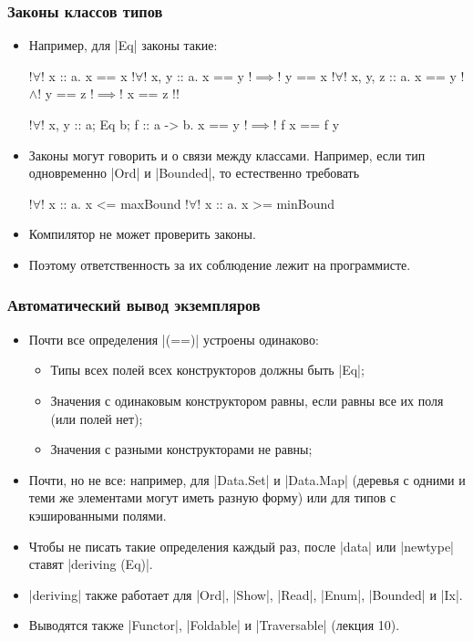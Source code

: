 \documentclass[10pt]{beamer}
\begin{document}
\begin{frame}[fragile]
  \frametitle{Законы классов типов}
  \begin{itemize}
    \item Например, для \haskinline|Eq| законы такие:\pause
          \begin{haskell}
            !$\forall$! x :: a. x == x
            !$\forall$! x, y :: a. x == y !$\implies$! y == x
            !$\forall$! x, y, z :: a. x == y !$\wedge$! y == z !$\implies$! x == z !\pause!

            !$\forall$! x, y :: a; Eq b; f :: a -> b. x == y !$\implies$\pause! 
                f x == f y
          \end{haskell}
          \pause
    \item Законы могут говорить и о связи между классами. Например, если тип одновременно \haskinline|Ord| и \haskinline|Bounded|, то естественно требовать
          \begin{haskell}
            !$\forall$! x :: a. x <= maxBound
            !$\forall$! x :: a. x >= minBound
          \end{haskell}
          \pause
    \item Компилятор не может проверить законы.
    \item Поэтому ответственность за их соблюдение лежит на программисте.
  \end{itemize}
\end{frame}

\begin{frame}[fragile]
  \frametitle{Автоматический вывод экземпляров}
  \begin{itemize}
    \item Почти все определения \haskinline|(==)| устроены одинаково:\pause
          \begin{itemize}
            \item Типы всех полей всех конструкторов должны быть \haskinline|Eq|;
            \item Значения с одинаковым конструктором равны, если равны все их поля (или полей нет);
            \item Значения с разными конструкторами не равны;
          \end{itemize}
    \item Почти, но не все: \pause например, для \haskinline|Data.Set| и \haskinline|Data.Map| (деревья с одними и теми же элементами могут иметь разную форму) или для типов с кэшированными полями.\pause
    \item Чтобы не писать такие определения каждый раз, после \haskinline|data| или \haskinline|newtype| ставят \haskinline|deriving (Eq)|.
    \item \haskinline|deriving| также работает для \haskinline|Ord|, \haskinline|Show|, \haskinline|Read|, \haskinline|Enum|, \haskinline|Bounded| и \haskinline|Ix|.

    \item Выводятся также \haskinline|Functor|, \haskinline|Foldable| и \haskinline|Traversable| (лекция 10).
  \end{itemize}
\end{frame}
\end{document}
